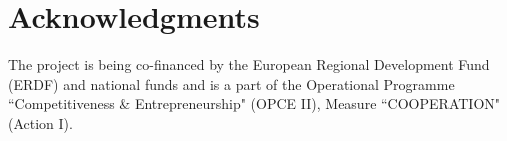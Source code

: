 \documentclass[conference]{IEEEtran}
\begin{document}
\section*{Acknowledgments}

The project is being co-financed by the European Regional Development Fund (ERDF)
and national funds and is a part of the Operational Programme ``Competitiveness \&
Entrepreneurship" (OPCE II), Measure ``COOPERATION" (Action I).


 
\end{document}
